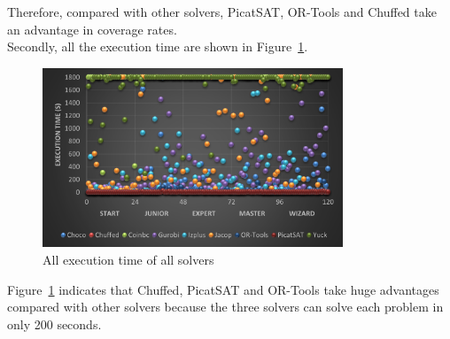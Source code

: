 Therefore, compared with other solvers, PicatSAT, OR-Tools and Chuffed take an advantage in coverage rates.
\\Secondly, all the execution time are shown in Figure~\ref{fig:execution time}.
\begin{figure}[H]
    \centering
    \includegraphics[width=0.8\textwidth]{figs/all_point_IQtwist.png}
    \caption{All execution time of all solvers}
    \label{fig:execution time}
\end{figure}
Figure~\ref{fig:execution time} indicates that Chuffed, PicatSAT and OR-Tools take huge advantages compared with other solvers because the three solvers can solve each problem in only 200 seconds.
